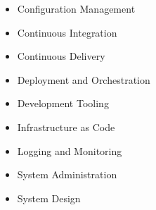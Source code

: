 \begin{itemize}
\item Configuration Management
\item Continuous Integration
\item Continuous Delivery
\item Deployment and Orchestration
\item Development Tooling
\item Infrastructure as Code
\item Logging and Monitoring
\item System Administration
\item System Design
\end{itemize}
